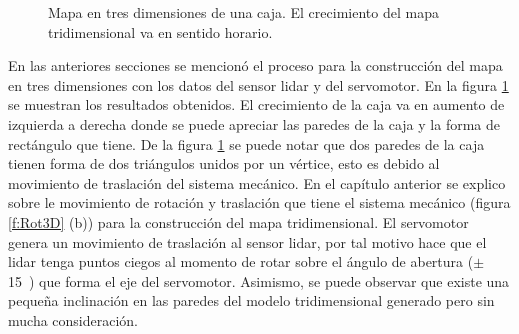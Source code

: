 \begin{figure}[ht!]
\begin{center}
    \end{center}
  \captionsetup{font=footnotesize}
    \caption{\label{fig:Caja3D}Mapa en tres dimensiones de una caja. El crecimiento del mapa tridimensional 
    va en sentido horario.}
\end{figure}


En las anteriores secciones se mencionó el proceso para la construcción del mapa en 
tres dimensiones con los datos del sensor lidar y del servomotor. En la figura 
\ref{fig:Caja3D} se muestran los resultados obtenidos. El crecimiento de la caja va en
aumento de izquierda a derecha donde se puede apreciar las paredes de la caja y la forma
de rectángulo que tiene. De la figura \ref{fig:Caja3D} se puede notar que dos paredes de 
la caja tienen forma de dos triángulos unidos por un vértice, esto es debido al movimiento 
de traslación del sistema mecánico. En el capítulo anterior se explico sobre le movimiento 
de rotación y traslación que tiene el sistema mecánico (figura \ref{f:Rot3D} (b)) para la 
construcción del mapa tridimensional. El servomotor genera un movimiento de traslación al 
sensor lidar, por tal motivo hace que el lidar tenga puntos ciegos al momento de rotar 
sobre el ángulo de abertura ($\pm$ 15\grad~) que forma el eje del servomotor. Asimismo,
se puede observar que existe una pequeña inclinación en las paredes del modelo 
tridimensional generado pero sin mucha consideración.

